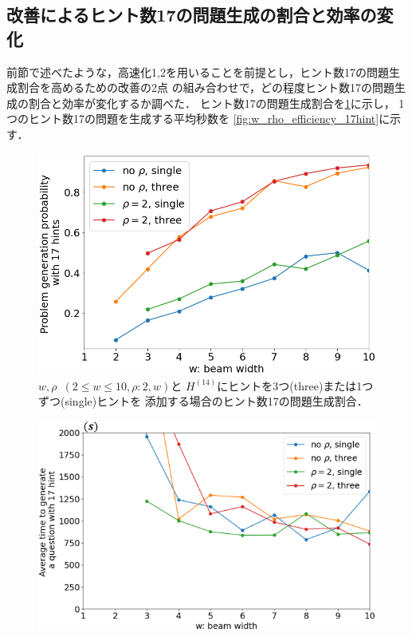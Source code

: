 \documentclass[a4paper, 9pt]{jarticle}
\begin{document}
\begin{論文概要}
\section{改善によるヒント数17の問題生成の割合と効率の変化}
前節で述べたような，高速化1,2を用いることを前提とし，ヒント数17の問題生成割合を高めるための改善の2点
の組み合わせで，どの程度ヒント数17の問題生成の割合と効率が変化するか調べた．
ヒント数17の問題生成割合を\figurename{\ref{fig:w_rho_prob_17hint}}に示し，
1つのヒント数17の問題を生成する平均秒数を
\figurename{\ref{fig:w_rho_efficiency_17hint}}に示す．
\begin{figure}[bt]
  \centering
  \includegraphics[keepaspectratio, scale=0.3]{w_rho_prob_17hint.png}
  \caption{$w,\rho$~$(2 \leq w \leq 10,\rho:2,w)$と
  $H^{(14)}$にヒントを3つ(three)または1つずつ(single)ヒントを
  添加する場合のヒント数17の問題生成割合．} 
  \label{fig:w_rho_prob_17hint}
\end{figure}
\begin{figure}[bt]
  \centering
  \includegraphics[keepaspectratio, scale=0.4]{w_rho_efficiency_17hint.png}

\end{figure}
\end{論文概要}
\end{document}
